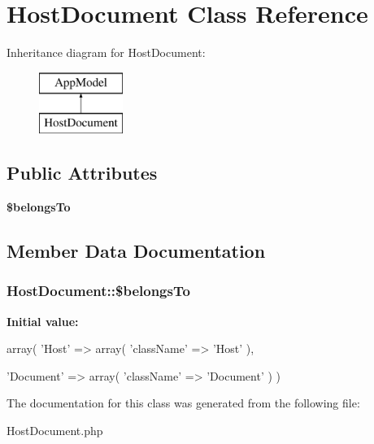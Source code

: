 \hypertarget{classHostDocument}{
\section{\-Host\-Document \-Class \-Reference}
\label{classHostDocument}
}
\-Inheritance diagram for \-Host\-Document\-:\begin{figure}[H]
\begin{center}
\leavevmode
\includegraphics[height=2.000000cm]{classHostDocument}
\end{center}
\end{figure}
\subsection*{\-Public \-Attributes}
\begin{DoxyCompactItemize}
\item 
{\bfseries \$belongs\-To}
\end{DoxyCompactItemize}


\subsection{\-Member \-Data \-Documentation}
\hypertarget{classHostDocument_aae1c35aafa6962321d72a883253dfd33}{
\subsubsection[{\$belongs\-To}]{\setlength{\rightskip}{0pt plus 5cm}\-Host\-Document\-::\$belongs\-To}}
\label{classHostDocument_aae1c35aafa6962321d72a883253dfd33}
{\bfseries \-Initial value\-:}
\begin{DoxyCode}
 array(
        'Host' => array(
            'className' => 'Host'
        ),

        'Document' => array(
            'className' => 'Document'
        )
    )
\end{DoxyCode}


\-The documentation for this class was generated from the following file\-:\begin{DoxyCompactItemize}
\item 
\-Host\-Document.\-php\end{DoxyCompactItemize}

